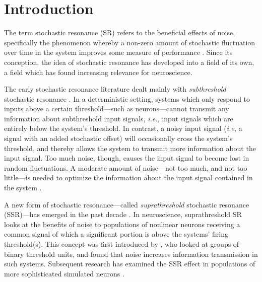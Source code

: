 \documentclass[12pt]{article}
\begin{document}

\section{Introduction}
\label{scn:introduction}

The term stochastic resonance (SR) refers to the beneficial effects of noise, specifically the phenomenon whereby a non-zero amount of stochastic fluctuation over time in the system improves some measure of performance \citep{McDonnell2009}. Since its conception, the idea of stochastic resonance has developed into a field of its own, a field which has found increasing relevance for neuroscience.

The early stochastic resonance literature dealt mainly with \emph{subthreshold} stochastic resonance \citep{Gammaitoni1998}. In a deterministic setting, systems which only respond to inputs above a certain threshold---such as neurons---cannot transmit any information about subthreshold input signals, \emph{i.e.,} input signals which are entirely below the system's threshold. In contrast, a noisy input signal (\emph{i.e,} a signal with an added stochastic offset) will occasionally cross the system's threshold, and thereby allows the system to transmit more information about the input signal. Too much noise, though, causes the input signal to become lost in random fluctuations. A moderate amount of noise---not too much, and not too little---is needed to optimize the information about the input signal contained in the system \citep{Wiesenfeld1994,Longtin1998}.

A new form of stochastic resonance---called \emph{suprathreshold} stochastic resonance (SSR)---has emerged in the past decade \citep{McDonnell2009,McDonnell2011}. In neuroscience, suprathreshold SR looks at the benefits of noise to populations of nonlinear neurons receiving a common signal of which a significant portion is above the systems' firing threshold(s). This concept was first introduced by \cite{Stocks2000}, who looked at groups of binary threshold units, and found that noise increases information transmission in such systems. Subsequent research has examined the SSR effect in populations of more sophisticated simulated neurons \citep{Stocks2001}.
\end{document}
